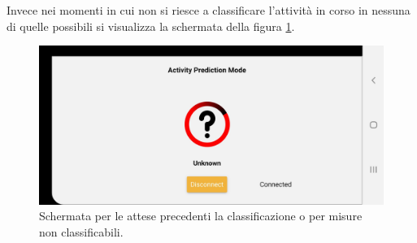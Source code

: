 Invece nei momenti in cui non si riesce a classificare l'attività in corso in nessuna di quelle possibili si visualizza la schermata della figura \ref{fig:attesa}.

\begin{figure}[tbh]
	\centering
	\includegraphics[width=0.4\linewidth]{./ImageFiles/unknown}
	\caption{Schermata per le attese precedenti la classificazione o per misure non classificabili.}
	\label{fig:attesa}
\end{figure}

